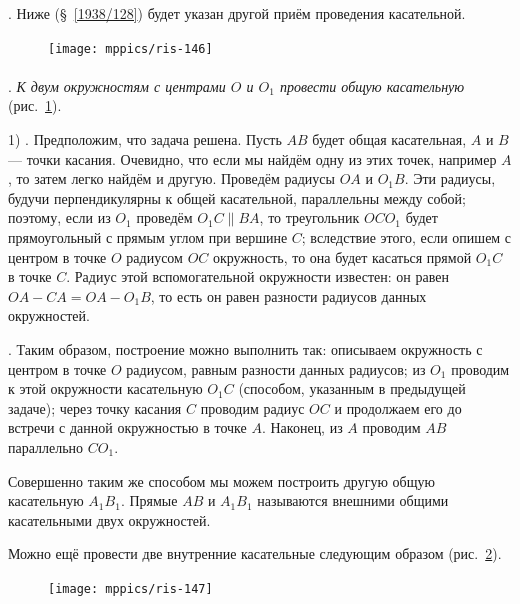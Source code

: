 \documentclass[twoside]{book}
\begin{document}
\smallskip
{}. Ниже (§~\ref{1938/128}) будет указан другой приём проведения касательной.

{

\begin{figure}
\vskip-3mm
\centering
\texttt{[image: mppics/ris-146]}
\caption{}\label{1938/ris-146}
\end{figure}

{\sloppy

\paragraph{}\label{1938/129}
\mbox{.}
\emph{К двум окружностям с центрами $O$ и $O_1$ провести общую касательную} (рис.~\ref{1938/ris-146}).

}

1) .
Предположим, что задача решена.
Пусть $AB$ будет общая касательная, $A$ и $B$ — точки касания.
Очевидно, что если мы найдём одну из этих точек, например $A$, то затем легко найдём и другую.
Проведём радиусы $OA$ и $O_1B$.
Эти радиусы, будучи перпендикулярны к общей касательной, параллельны между собой;
поэтому, если из $O_1$ проведём $O_1C\parallel BA$, то треугольник $OCO_1$ будет прямоугольный с прямым углом при вершине $C$;
вследствие этого, если опишем с центром в точке $O$ радиусом $OC$ окружность, то она будет касаться прямой $O_1C$ в точке $C$.
Радиус этой вспомогательной окружности известен:
он равен $OA-CA=OA-O_1B$, то есть
он равен разности радиусов данных окружностей.

}

\smallskip
{}.
Таким образом, построение можно выполнить так:
описываем окружность с центром в точке $O$ радиусом, равным разности данных радиусов;
из $O_1$ проводим к этой окружности касательную $O_1C$ (способом, указанным в предыдущей задаче);
через точку касания $C$ проводим радиус $OC$ и продолжаем его до встречи с данной окружностью в точке $A$.
Наконец, из $A$ проводим $AB$ параллельно $CO_1$.

Совершенно таким же способом мы можем построить другую общую касательную $A_1B_1$.
Прямые $AB$ и $A_1B_1$ называются внешними общими касательными двух окружностей.

Можно ещё провести две внутренние касательные следующим образом (рис.~\ref{1938/ris-147}).

\begin{figure}
\centering
\texttt{[image: mppics/ris-147]}
\caption{}\label{1938/ris-147}
\end{figure}
\end{document}
